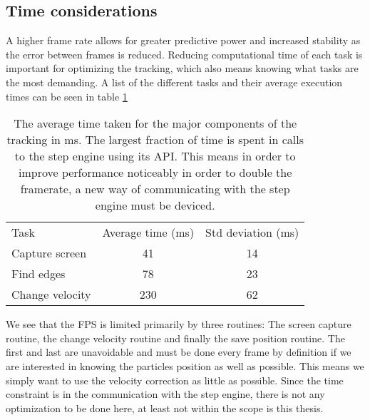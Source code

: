 \subsection{Time considerations}\label{sec:time considerations}
A higher frame rate allows for greater predictive power and increased stability as the error between frames is 
reduced. Reducing computational time of each task is important for optimizing the tracking, which also means knowing 
what tasks are the most demanding. A list of the different tasks and their average execution times can be seen in table 
\ref{tab:benchmarks}


\begin{table}[H]
 \begin{tabular}{l | c | c } 
 Task  			&  Average time (ms) & Std deviation (ms)\\
 Capture screen & 41 			& 14 \\
 Find edges 	& 78			& 23 \\
 Change velocity& 230			& 62 \\
 \end{tabular}
 
 \caption{The average time taken for the major components of the tracking in ms. The largest fraction of time is spent in calls to the step engine using its API. This means in order to improve performance noticeably in order to double the framerate, a new way of communicating with the step engine must be deviced.}
 \label{tab:benchmarks}
\end{table}

We see that the FPS is limited primarily by three routines: The screen capture routine, the change velocity routine and finally the save position routine. The first and last are unavoidable and must be done every frame by definition if we are interested in knowing the particles position as well as possible. This means we simply want to use the velocity correction as little as possible. Since the time constraint is in the communication with the step engine, there is not any optimization to be done here, at least not within the scope is this thesis. 

